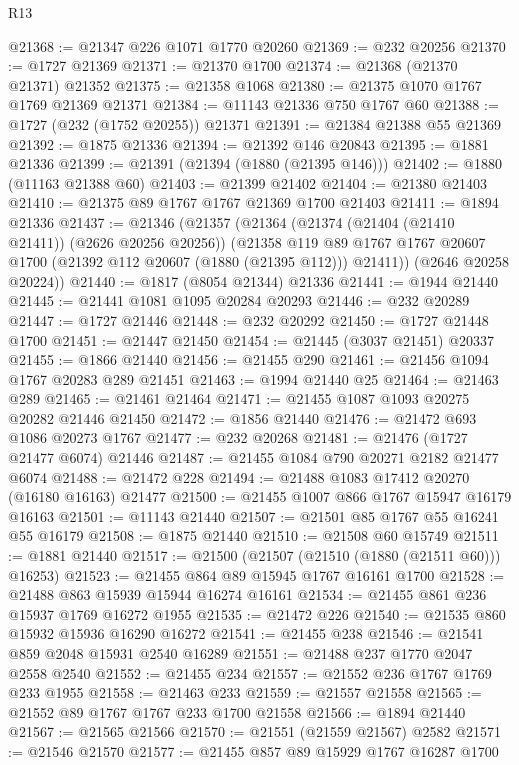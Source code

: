 \begin{lexlean}{R13}
\begin{coremodule}
@21368 := @21347 @226 @1071 @1770 @20260
@21369 := @232 @20256
@21370 := @1727 @21369
@21371 := @21370 @1700
@21374 := @21368 (@21370 @21371) @21352
@21375 := @21358 @1068
@21380 := @21375 @1070 @1767 @1769 @21369 @21371
@21384 := @11143 @21336 @750 @1767 @60
@21388 := @1727 (@232 (@1752 @20255)) @21371
@21391 := @21384 @21388 @55 @21369
@21392 := @1875 @21336
@21394 := @21392 @146 @20843
@21395 := @1881 @21336
@21399 := @21391 (@21394 (@1880 (@21395 @146)))
@21402 := @1880 (@11163 @21388 @60)
@21403 := @21399 @21402
@21404 := @21380 @21403
@21410 := @21375 @89 @1767 @1767 @21369 @1700 @21403
@21411 := @1894 @21336
@21437 := @21346
    (@21357
      (@21364
        (@21374 (@21404 (@21410 @21411)) (@2626 @20256 @20256))
        (@21358
          @119
          @89
          @1767
          @1767
          @20607
          @1700
          (@21392 @112 @20607 (@1880 (@21395 @112)))
          @21411))
      (@2646 @20258 @20224))
@21440 := @1817 (@8054 @21344) @21336
@21441 := @1944 @21440
@21445 := @21441 @1081 @1095 @20284 @20293
@21446 := @232 @20289
@21447 := @1727 @21446
@21448 := @232 @20292
@21450 := @1727 @21448 @1700
@21451 := @21447 @21450
@21454 := @21445 (@3037 @21451) @20337
@21455 := @1866 @21440
@21456 := @21455 @290
@21461 := @21456 @1094 @1767 @20283 @289 @21451
@21463 := @1994 @21440 @25
@21464 := @21463 @289
@21465 := @21461 @21464
@21471 := @21455 @1087 @1093 @20275 @20282 @21446 @21450
@21472 := @1856 @21440
@21476 := @21472 @693 @1086 @20273 @1767
@21477 := @232 @20268
@21481 := @21476 (@1727 @21477 @6074) @21446
@21487 := @21455 @1084 @790 @20271 @2182 @21477 @6074
@21488 := @21472 @228
@21494 := @21488 @1083 @17412 @20270 (@16180 @16163) @21477
@21500 := @21455 @1007 @866 @1767 @15947 @16179 @16163
@21501 := @11143 @21440
@21507 := @21501 @85 @1767 @55 @16241 @55 @16179
@21508 := @1875 @21440
@21510 := @21508 @60 @15749
@21511 := @1881 @21440
@21517 := @21500 (@21507 (@21510 (@1880 (@21511 @60))) @16253)
@21523 := @21455 @864 @89 @15945 @1767 @16161 @1700
@21528 := @21488 @863 @15939 @15944 @16274 @16161
@21534 := @21455 @861 @236 @15937 @1769 @16272 @1955
@21535 := @21472 @226
@21540 := @21535 @860 @15932 @15936 @16290 @16272
@21541 := @21455 @238
@21546 := @21541 @859 @2048 @15931 @2540 @16289
@21551 := @21488 @237 @1770 @2047 @2558 @2540
@21552 := @21455 @234
@21557 := @21552 @236 @1767 @1769 @233 @1955
@21558 := @21463 @233
@21559 := @21557 @21558
@21565 := @21552 @89 @1767 @1767 @233 @1700 @21558
@21566 := @1894 @21440
@21567 := @21565 @21566
@21570 := @21551 (@21559 @21567) @2582
@21571 := @21546 @21570
@21577 := @21455 @857 @89 @15929 @1767 @16287 @1700

\end{coremodule}
\end{lexlean}
